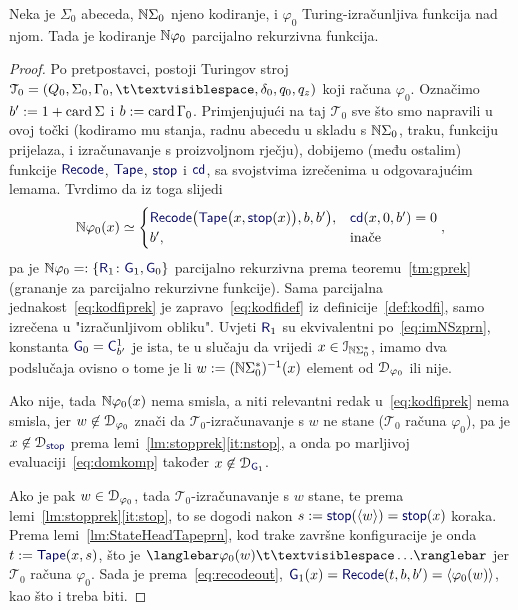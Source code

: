 \begin{teorem}\label{tm:tikp}
Neka je $\Sigma_0$ abeceda, ${\mathbb N}\Sigma_0$ njeno kodiranje, i $\varphi_0$ Turing-izračunljiva funkcija nad njom. Tada je kodiranje ${\mathbb N}\varphi_0$ parcijalno rekurzivna funkcija.
\end{teorem}
\begin{proof}
Po pretpostavci, postoji Turingov stroj $\mathcal T_0=(Q_0,\Sigma_0,\Gamma_0,\bl,\delta_0,q_0,q_z)$ koji računa $\varphi_0$. Označimo $b':=1+\operatorname{card}\Sigma$ i $b:=\operatorname{card}\Gamma_0$. Primjenjujući na taj $\mathcal T_0$ sve što smo napravili u ovoj točki (kodiramo mu stanja, radnu abecedu u skladu s ${\mathbb N}\Sigma_0$, traku, funkciju prijelaza, i izračunavanje s proizvoljnom rječju), dobijemo (među ostalim) funkcije $\f{Recode}$, $\f{Tape}$, $\f{stop}$ i $\f{cd}$, sa svojstvima izrečenima u odgovarajućim lemama. Tvrdimo da iz toga slijedi
\begin{equation}\label{eq:kodfiprek}
    \N\varphi_0(x)\simeq\begin{cases}
    \f{Recode}\bigl(\f{Tape}\bigl(x,\f{stop}(x)\bigr),b,b'\bigr),&\f{cd}(x,0,b')=0\\
    b',&\text{inače}
    \end{cases}\text,
\end{equation}
pa je $\N\varphi_0=:\{\f R_1\colon\f G_1,\f G_0\}$ parcijalno rekurzivna prema teoremu~\ref{tm:gprek} (grananje za parcijalno rekurzivne funkcije). Sama parcijalna jednakost~\eqref{eq:kodfiprek} je zapravo~\eqref{eq:kodfidef} iz definicije~\ref{def:kodfi}, samo izrečena u "izračunljivom obliku". Uvjeti $\f R_1$ su ekvivalentni po~\eqref{eq:imNSzprn}, konstanta $\f G_0=\f C_{b'}^1$ je ista, te u slučaju da vrijedi $x\in\mathcal I_{{\mathbb N}\Sigma_0^*}$, imamo dva podslučaja ovisno o tome je li $w:=({\mathbb N}\Sigma_0^*)^{-1}(x)$ element od $\mathcal D_{\varphi_0}$ ili nije.

Ako nije, tada ${\mathbb N}\varphi_0(x)$ nema smisla, a niti relevantni redak u~\eqref{eq:kodfiprek} nema smisla, jer $w\not\in\mathcal D_{\varphi_0}$ znači da $\mathcal T_0$-izračunavanje s $w$ ne stane ($\mathcal T_0$ računa $\varphi_0$), pa je $x\not\in\dom{\f{stop}}$ prema lemi~\ref{lm:stopprek}\eqref{it:nstop}, a onda po marljivoj evaluaciji~\eqref{eq:domkomp} također $x\not\in\dom{\f G_1}$.

Ako je pak $w\in\mathcal D_{\varphi_0}$, tada $\mathcal T_0$-izračunavanje s $w$ stane, te prema lemi~\ref{lm:stopprek}\eqref{it:stop}, to se dogodi nakon $s:=\f{stop}(\kr w)=\f{stop}(x)$ koraka. Prema lemi~\ref{lm:StateHeadTapeprn}, kod trake završne konfiguracije je onda $t:=\f{Tape}(x,s)$, što je $\knk{\varphi_0(w)\bl\ldots}$ jer $\mathcal T_0$ računa $\varphi_0$. Sada je prema~\eqref{eq:recodeout}, $\f G_1(x)=\f{Recode}(t,b,b')=\kr{\varphi_0(w)}$, kao što i treba biti.
\end{proof}

